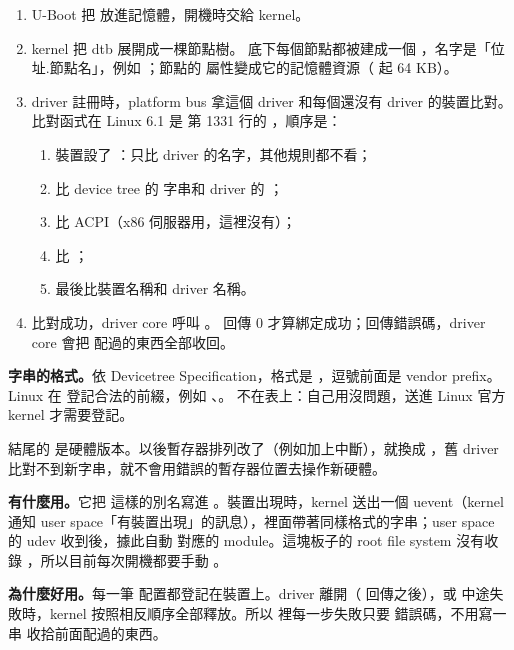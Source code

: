 \begin{enumerate}
\item U-Boot 把  放進記憶體，開機時交給 kernel。
\item kernel 把 dtb 展開成一棵節點樹。 底下每個節點都被建成一個 ，名字是「位址.節點名」，例如 ；節點的  屬性變成它的記憶體資源（ 起 64 KB）。
\item driver 註冊時，platform bus 拿這個 driver 和每個還沒有 driver 的裝置比對。比對函式在 Linux 6.1 是  第 1331 行的 ，順序是：
\begin{enumerate}
\item 裝置設了 ：只比 driver 的名字，其他規則都不看；
\item 比 device tree 的  字串和 driver 的 ；
\item 比 ACPI（x86 伺服器用，這裡沒有）；
\item 比 ；
\item 最後比裝置名稱和 driver 名稱。
\end{enumerate}
\item 比對成功，driver core 呼叫 。 回傳 0 才算綁定成功；回傳錯誤碼，driver core 會把  配過的東西全部收回。
\end{enumerate}

\textbf{ 字串的格式。}依 Devicetree Specification，格式是 ，逗號前面是 vendor prefix。Linux 在  登記合法的前綴，例如 、。 不在表上：自己用沒問題，送進 Linux 官方 kernel 才需要登記。

結尾的  是硬體版本。以後暫存器排列改了（例如加上中斷），就換成 ，舊 driver 比對不到新字串，就不會用錯誤的暫存器位置去操作新硬體。

\textbf{ 有什麼用。}它把  這樣的別名寫進 。裝置出現時，kernel 送出一個 uevent（kernel 通知 user space「有裝置出現」的訊息），裡面帶著同樣格式的字串；user space 的 udev 收到後，據此自動  對應的 module。這塊板子的 root file system 沒有收錄 ，所以目前每次開機都要手動 。

\textbf{ 為什麼好用。}每一筆  配置都登記在裝置上。driver 離開（ 回傳之後），或  中途失敗時，kernel 按照相反順序全部釋放。所以  裡每一步失敗只要  錯誤碼，不用寫一串  收拾前面配過的東西。

